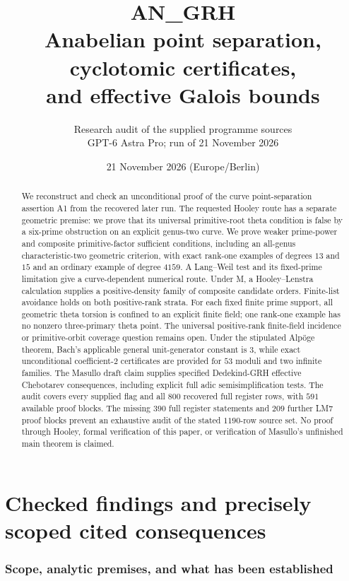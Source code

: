 \documentclass[11pt,a4paper]{article}
\title{\textbf{AN\_GRH}\\[7pt]Anabelian point separation, cyclotomic certificates,\\and effective Galois bounds}
\author{Research audit of the supplied programme sources\\GPT-6 Astra Pro; run of 21 November 2026}
\date{21 November 2026 (Europe/Berlin)}
\begin{document}
\maketitle
\begin{abstract}
We reconstruct and check an unconditional proof of the curve point-separation
assertion A1 from the recovered later run. The requested Hooley route has a
separate geometric premise: we prove that its universal primitive-root theta
condition is false by a six-prime obstruction on an explicit genus-two curve.
We prove weaker prime-power and composite primitive-factor sufficient
conditions, including an all-genus characteristic-two geometric criterion,
with exact rank-one examples of degrees $13$ and $15$ and an
ordinary example of degree $4159$. A Lang--Weil test and its fixed-prime
limitation give a curve-dependent numerical route. Under M, a Hooley--Lenstra
calculation supplies a positive-density family of composite candidate orders.
Finite-list avoidance holds on both positive-rank strata. For each fixed
finite prime support, all geometric theta torsion is confined to an explicit
finite field; one rank-one example has no nonzero three-primary theta point.
The universal
positive-rank finite-field incidence or primitive-orbit coverage question
remains open.
Under the stipulated Alp\"oge theorem, Bach's applicable general unit-generator
constant is $3$, while exact unconditional coefficient-$2$ certificates are
provided for $53$ moduli and two infinite families. The Masullo draft claim
supplies specified Dedekind-GRH effective Chebotarev consequences, including
explicit full adic semisimplification tests. The audit covers every supplied
flag and all $800$ recovered full register rows, with $591$ available proof
blocks. The missing $390$ full register statements and $209$ further LM7
proof blocks prevent an exhaustive audit of the stated $1190$-row source set.
No proof through Hooley, formal verification of this paper, or verification
of Masullo's unfinished main theorem is claimed.
\end{abstract}
\tableofcontents
\clearpage
\part{Checked findings and precisely scoped cited consequences}
\section{Scope, analytic premises, and what has been established}
\label{sec:premises}
\end{document}
